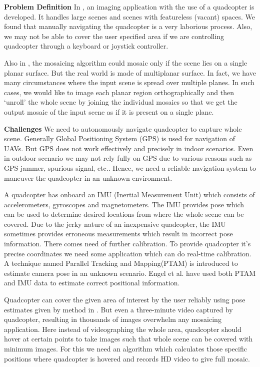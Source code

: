 \textbf{Problem Definition}
In \cite{Prasad16},  an imaging application with the use of a quadcopter is
developed. It handles large scenes and scenes with featureless (vacant) spaces.
We found that manually navigating the quadcopter is a very laborious process.
Also, we may not be able to cover the user specified area if we are controlling
quadcopter through a keyboard or joystick controller.

Also in \cite{Prasad16}, the mosaicing algorithm could
mosaic only if the scene lies on a single planar surface. But the real world is 
made of multiplanar surface. In fact, we have many circumstances where the
input scene is spread over multiple planes. In such cases, we would like to
image each planar region orthographically and then `unroll' the whole scene by joining the
individual mosaics so that we get the output mosaic of the input scene as if it
is present on a single plane.
 
\textbf{Challenges}
We need to autonomously navigate quadcopter to capture whole scene. Generally
Global Positioning System (GPS) is used for navigation of UAVs.
But GPS does not work effectively and precisely in indoor scenarios. Even in outdoor
scenario we may not rely fully on GPS due to various reasons such as GPS
jammer, spurious signal, etc.. Hence, we need a reliable navigation system to
maneuver the quadcopter in an unknown environment.

A quadcopter has onboard an IMU (Inertial Measurement Unit)  which consists of
accelerometers, gyroscopes and magnetometers. The IMU provides pose which can be
used to   determine desired locations from where the whole scene can be covered.
Due to the  jerky nature of an inexpensive quadcopter, the IMU sometimes
provides erroneous measurements  which result in incorrect pose information. There comes need of
further calibration.  To provide quadcopter it’s precise coordinates we need
some application which can do real-time calibration.
A technique named Parallel Tracking and Mapping(PTAM) \cite{klein} is introduced
to estimate camera pose in an unknown scenario.
Engel et al. \cite{engel} have used both PTAM and IMU data to estimate  correct
positional information.

Quadcopter can cover the given area of interest by the user reliably using pose
estimates given by method in \cite{engel}. But even a three-minute video
captured by quadcopter, resulting in thousands of images overwhelm any mosaicing
application. Here instead of videographing the whole area, quadcopter should
hover at certain points to take images such that whole scene can be covered with
minimum images. For this we need an algorithm which calculates those
specific positions  where quadcopter is hovered and records HD video to give
full mosaic.

